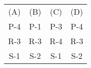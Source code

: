 \begin{tabular}{c c c c }
   (A)  & (B) & (C) & (D)  \\
     P-4 & P-1 & P-3 & P-4 \\
     R-3 & R-3 & R-4 & R-3 \\
     S-1 & S-2 & S-1 & S-2
\end{tabular}
